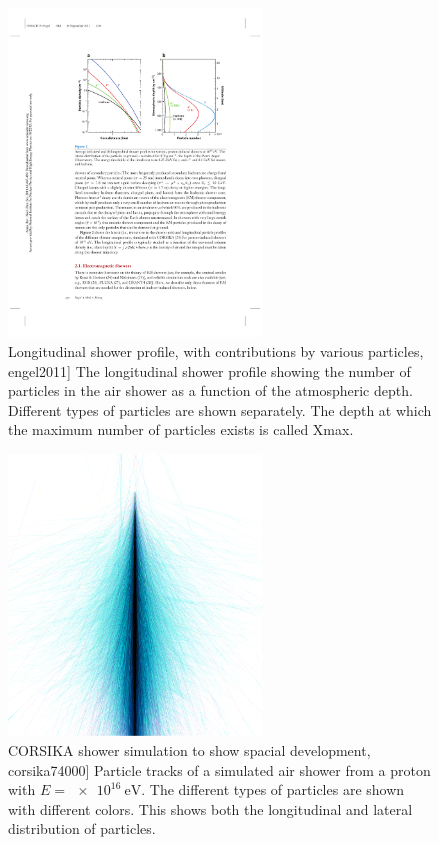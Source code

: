 \begin{figure}
    \centering
    \includegraphics[width=0.6\textwidth]
                    {plots/cosmic-rays/longitudinal_profile}
    \caption{Longitudinal shower profile, with contributions by various particles, engel2011]
The longitudinal shower profile showing the number of particles in the air shower as a function of the atmospheric depth. Different types of particles are shown separately. The depth at which the maximum number of particles exists is called Xmax.}
    \label{fig:longitudinal_profile}
\end{figure}

\begin{figure}
    \centering
    \includegraphics[width=0.6\textwidth]
                    {plots/cosmic-rays/shower.png}
    \caption{CORSIKA shower simulation to show spacial development, corsika74000]
Particle tracks of a simulated air shower from a proton with $E = \SI{e16}{\eV}$. The different types of particles are shown with different colors. This shows both the longitudinal and lateral distribution of particles.}
    \label{fig:shower}
\end{figure}

